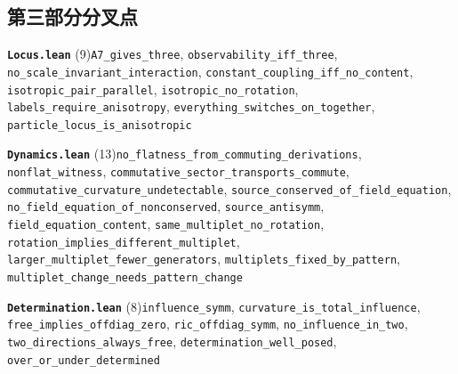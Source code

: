 \documentclass[11pt,a4paper]{article}
\theoremstyle{sudef}
\begin{document}
\subsection*{第三部分\quad 分叉点}
\noindent\textbf{\texttt{Locus.lean}} (9)\quad \texttt{A7\_\allowbreak gives\_\allowbreak three}, \texttt{observability\_\allowbreak iff\_\allowbreak three}, \texttt{no\_\allowbreak scale\_\allowbreak invariant\_\allowbreak interaction}, \texttt{constant\_\allowbreak coupling\_\allowbreak iff\_\allowbreak no\_\allowbreak content}, \texttt{isotropic\_\allowbreak pair\_\allowbreak parallel}, \texttt{isotropic\_\allowbreak no\_\allowbreak rotation}, \texttt{labels\_\allowbreak require\_\allowbreak anisotropy}, \texttt{everything\_\allowbreak switches\_\allowbreak on\_\allowbreak together}, \texttt{particle\_\allowbreak locus\_\allowbreak is\_\allowbreak anisotropic}\par\smallskip
\noindent\textbf{\texttt{Dynamics.lean}} (13)\quad \texttt{no\_\allowbreak flatness\_\allowbreak from\_\allowbreak commuting\_\allowbreak derivations}, \texttt{nonflat\_\allowbreak witness}, \texttt{commutative\_\allowbreak sector\_\allowbreak transports\_\allowbreak commute}, \texttt{commutative\_\allowbreak curvature\_\allowbreak undetectable}, \texttt{source\_\allowbreak conserved\_\allowbreak of\_\allowbreak field\_\allowbreak equation}, \texttt{no\_\allowbreak field\_\allowbreak equation\_\allowbreak of\_\allowbreak nonconserved}, \texttt{source\_\allowbreak antisymm}, \texttt{field\_\allowbreak equation\_\allowbreak content}, \texttt{same\_\allowbreak multiplet\_\allowbreak no\_\allowbreak rotation}, \texttt{rotation\_\allowbreak implies\_\allowbreak different\_\allowbreak multiplet}, \texttt{larger\_\allowbreak multiplet\_\allowbreak fewer\_\allowbreak generators}, \texttt{multiplets\_\allowbreak fixed\_\allowbreak by\_\allowbreak pattern}, \texttt{multiplet\_\allowbreak change\_\allowbreak needs\_\allowbreak pattern\_\allowbreak change}\par\smallskip
\noindent\textbf{\texttt{Determination.lean}} (8)\quad \texttt{influence\_\allowbreak symm}, \texttt{curvature\_\allowbreak is\_\allowbreak total\_\allowbreak influence}, \texttt{free\_\allowbreak implies\_\allowbreak offdiag\_\allowbreak zero}, \texttt{ric\_\allowbreak offdiag\_\allowbreak symm}, \texttt{no\_\allowbreak influence\_\allowbreak in\_\allowbreak two}, \texttt{two\_\allowbreak directions\_\allowbreak always\_\allowbreak free}, \texttt{determination\_\allowbreak well\_\allowbreak posed}, \texttt{over\_\allowbreak or\_\allowbreak under\_\allowbreak determined}\par\smallskip
\end{document}
